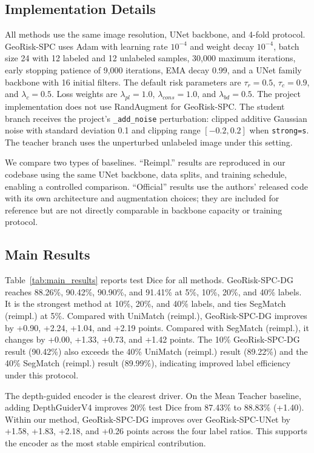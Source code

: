 \documentclass[journal]{IEEEtran}
\begin{document}
\subsection{Implementation Details}
All methods use the same image resolution, UNet backbone, and 4-fold protocol. GeoRisk-SPC uses Adam with learning rate $10^{-4}$ and weight decay $10^{-4}$, batch size 24 with 12 labeled and 12 unlabeled samples, 30,000 maximum iterations, early stopping patience of 9,000 iterations, EMA decay 0.99, and a UNet family backbone with 16 initial filters. The default risk parameters are $\tau_r=0.5$, $\tau_c=0.9$, and $\lambda_c=0.5$. Loss weights are $\lambda_{pl}=1.0$, $\lambda_{cons}=1.0$, and $\lambda_{bd}=0.5$. The project implementation does not use RandAugment for GeoRisk-SPC. The student branch receives the project's \texttt{\_add\_noise} perturbation: clipped additive Gaussian noise with standard deviation 0.1 and clipping range $[-0.2,0.2]$ when \texttt{strong=s}. The teacher branch uses the unperturbed unlabeled image under this setting.

We compare two types of baselines. ``Reimpl.'' results are reproduced in our codebase using the same UNet backbone, data splits, and training schedule, enabling a controlled comparison. ``Official'' results use the authors' released code with its own architecture and augmentation choices; they are included for reference but are not directly comparable in backbone capacity or training protocol.

\subsection{Main Results}
Table~\ref{tab:main_results} reports test Dice for all methods. GeoRisk-SPC-DG reaches 88.26\%, 90.42\%, 90.90\%, and 91.41\% at 5\%, 10\%, 20\%, and 40\% labels. It is the strongest method at 10\%, 20\%, and 40\% labels, and ties SegMatch (reimpl.) at 5\%. Compared with UniMatch (reimpl.), GeoRisk-SPC-DG improves by +0.90, +2.24, +1.04, and +2.19 points. Compared with SegMatch (reimpl.), it changes by +0.00, +1.33, +0.73, and +1.42 points. The 10\% GeoRisk-SPC-DG result (90.42\%) also exceeds the 40\% UniMatch (reimpl.) result (89.22\%) and the 40\% SegMatch (reimpl.) result (89.99\%), indicating improved label efficiency under this protocol.

The depth-guided encoder is the clearest driver. On the Mean Teacher baseline, adding DepthGuiderV4 improves 20\% test Dice from 87.43\% to 88.83\% (+1.40). Within our method, GeoRisk-SPC-DG improves over GeoRisk-SPC-UNet by +1.58, +1.83, +2.18, and +0.26 points across the four label ratios. This supports the encoder as the most stable empirical contribution.
\end{document}
